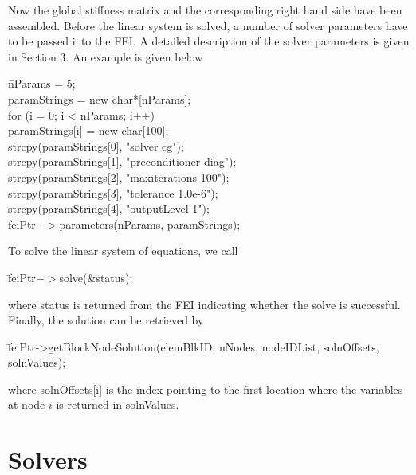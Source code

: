 Now the global stiffness matrix and the corresponding right hand side
have been assembled. Before the linear system is solved, a number of
solver parameters have to be passed into the {\sf FEI}. A detailed
description of the solver parameters is given in Section 3. An example
is given below
\begin{tabbing}
\hspace{0.5in} \= {\sf nParams = 5;} \\
               \> {\sf paramStrings = new char*[nParams];} \\
               \> {\sf for (i = 0; i < nParams; i++) }\\
               \> \hspace{0.5in} {\sf paramStrings[i] = new char[100];} \\
               \> {\sf strcpy(paramStrings[0], "solver cg");} \\
               \> {\sf strcpy(paramStrings[1], "preconditioner diag");} \\
               \> {\sf strcpy(paramStrings[2], "maxiterations 100");} \\
               \> {\sf strcpy(paramStrings[3], "tolerance 1.0e-6");} \\
               \> {\sf strcpy(paramStrings[4], "outputLevel 1");} \\
               \> {\sf feiPtr$->$parameters(nParams, paramStrings);}
\end{tabbing}
                                                                                
To solve the linear system of equations, we call
\begin{tabbing}
\hspace{0.5in} \= {\sf feiPtr$->$solve(\&status);}
\end{tabbing}
where {\sf status} is returned from the {\sf FEI} indicating whether
the solve is successful. Finally, the solution can be retrieved by
\begin{tabbing}
\hspace{0.5in} \= {\sf feiPtr->getBlockNodeSolution(elemBlkID, nNodes, nodeIDList, solnOffsets, solnValues);}
\end{tabbing}
where {\sf solnOffsets[i]} is the index pointing to the first location
where the variables at node $i$ is returned in {\sf solnValues}.
                                                                                
\section{\hypre{} Solvers}
                                                                                
